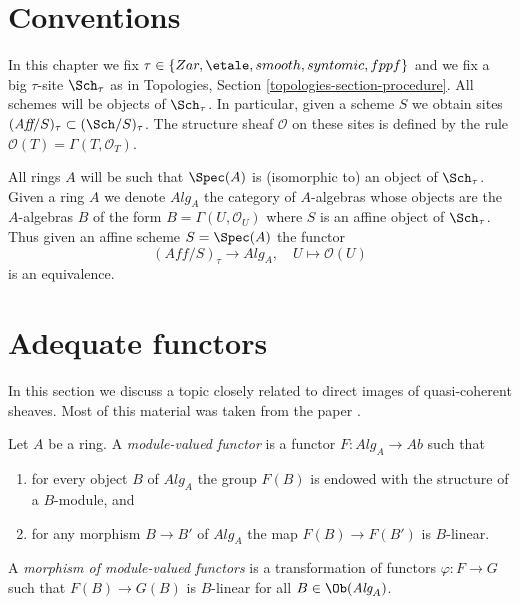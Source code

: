 \section{Conventions}
\label{section-conventions}

\noindent
In this chapter we fix
$\tau \in \{Zar, \etale, smooth, syntomic, fppf\}$
and we fix a big $\tau$-site $\Sch_\tau$ as in
Topologies, Section \ref{topologies-section-procedure}.
All schemes will be objects of $\Sch_\tau$.
In particular, given a scheme $S$ we obtain sites
$(\textit{Aff}/S)_\tau \subset (\Sch/S)_\tau$.
The structure sheaf $\mathcal{O}$ on these sites is defined by
the rule $\mathcal{O}(T) = \Gamma(T, \mathcal{O}_T)$.

\medskip\noindent
All rings $A$ will be such that $\Spec(A)$ is (isomorphic to) an
object of $\Sch_\tau$. Given a ring $A$ we denote
$\textit{Alg}_A$ the category of $A$-algebras whose objects are the
$A$-algebras $B$ of the form $B = \Gamma(U, \mathcal{O}_U)$
where $S$ is an affine object of $\Sch_\tau$. Thus given an
affine scheme $S = \Spec(A)$ the functor
$$
(\textit{Aff}/S)_\tau \longrightarrow \textit{Alg}_A,
\quad
U \longmapsto \mathcal{O}(U)
$$
is an equivalence.





\section{Adequate functors}
\label{section-quasi-coherent}

\noindent
In this section we discuss a topic closely related to
direct images of quasi-coherent sheaves. Most of this material
was taken from the paper \cite{Jaffe}.

\begin{definition}
\label{definition-module-valued-functor}
Let $A$ be a ring. A {\it module-valued functor} is a functor
$F : \textit{Alg}_A \to \textit{Ab}$ such that
\begin{enumerate}
\item for every object $B$ of $\textit{Alg}_A$ the group
$F(B)$ is endowed with the structure of a $B$-module, and
\item for any morphism $B \to B'$ of $\textit{Alg}_A$ the map
$F(B) \to F(B')$ is $B$-linear.
\end{enumerate}
A {\it morphism of module-valued functors} is a transformation of
functors $\varphi : F \to G$ such that $F(B) \to G(B)$ is $B$-linear
for all $B \in \Ob(\textit{Alg}_A)$.
\end{definition}

